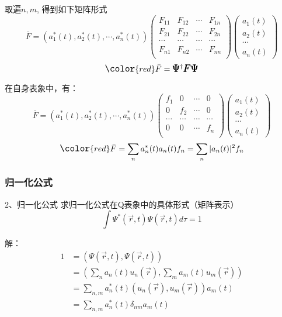 \begin{frame} 
    取遍$n, m$, 得到如下矩阵形式\\
    $$\bar{F} =(a_1 ^*(t), a_2 ^*(t),\cdots,a_n^*(t) )
    \begin{pmatrix}
       F_{11} & F_{12} & \cdots & F_{1n} \\
       F_{21} & F_{22} & \cdots & F_{2n} \\
       \cdots & \cdots &  \cdots& \cdots\\
        F_{n1} & F_{n2} & \cdots & F_{nn} \\
    \end{pmatrix}
    \begin{pmatrix}
        a_1(t)\\
        a_2(t)\\
        \cdots \\
        a_n(t)
    \end{pmatrix}
    $$ \vspace{1.0em} 
    $$ \large \color{red} \bar{F} = \pmb {\Psi} ^{\dagger } \pmb {F} \pmb {\Psi} $$
\end{frame}

\begin{frame} 
    在自身表象中，有：
    $$\bar{F} =(a_1 ^*(t), a_2 ^*(t),\cdots,a_n^*(t) )
    \begin{pmatrix}
       f_1 & 0 & \cdots & 0 \\
       0& f_2 & \cdots & 0 \\
       \cdots & \cdots &  \cdots& \cdots\\
        0 & 0 & \cdots & f_n \\
    \end{pmatrix}
    \begin{pmatrix}
        a_1(t)\\
        a_2(t)\\
        \cdots \\
        a_n(t)
    \end{pmatrix}
    $$
    \vspace{1.0em} 
    $$ \large \color{red} \bar{F} = \sum_n a_n^*(t) a_n(t) f_n= \sum_n |a_n(t)|^2 f_n $$
\end{frame}

\begin{frame} 
    \frametitle{归一化公式}
    \begin{tcolorbox1}{2、归一化公式}
        求归一化公式在Q表象中的具体形式（矩阵表示）
        $$ \int \Psi^* (\vec{r},t) \Psi(\vec{r},t) d\tau =1 $$
    \end{tcolorbox1}
    \alert{解：} 
    \begin{equation*}
        \begin{split}
            1 &=(\Psi(\vec{r},t), \Psi(\vec{r},t)) \\
            &= (\sum_n a_n(t) u_n(\vec{r}), \sum_m a_m(t) u_m(\vec{r}))\\
            &= \sum_{n,m} a_n ^*(t) (u_n(\vec{r}), u_m(\vec{r})) a_m(t)\\
            &= \sum_{n,m} a_n ^*(t) \delta_{nm} a_m(t)\\
        \end{split} 
    \end{equation*}
\end{frame}


